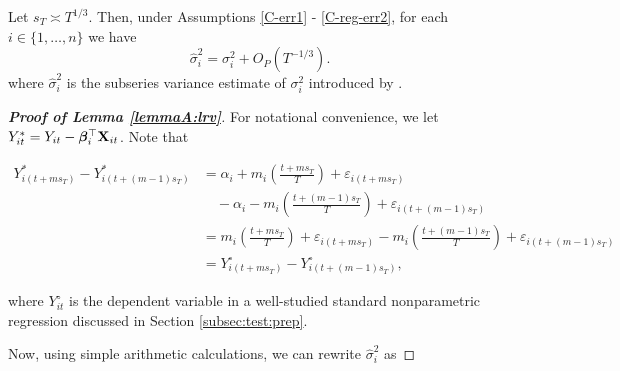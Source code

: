 \documentclass[a4paper,12pt]{article}
\makeatletter
\renewcommand{\eqref}[1]{\tagform@{\ref{#1}}}
\makeatother
\begin{document}
\begin{lemmaA}\label{lemmaA:lrv}
Let $s_T \asymp T^{1/3}$. Then, under Assumptions \ref{C-err1} - \ref{C-reg-err2}, for each $i \in \{1, \ldots, n\}$ we have
$$\widehat{\sigma}_i^2 = \sigma_i^2 + O_P(T^{-1/3}).$$
where $\widehat{\sigma}_i^2$ is the subseries variance estimate of $\sigma_i^2$ introduced by \eqref{eq:lrv}.
\end{lemmaA}
\begin{proof}[\textnormal{\textbf{Proof of Lemma \ref{lemmaA:lrv}}}]
For notational convenience, we let $Y_{it}^* = Y_{it} - \bm{\beta}_i^\top \mathbf{X}_{it}$. Note that 
\begin{small}
\begin{align*}
Y_{i(t + ms_T)}^* - Y_{i(t + (m-1)s_T)}^* &= \alpha_i + m_i\left(\frac{t+m s_T}{T}\right) + \varepsilon_{i(t + ms_T)} \\
&\quad-  \alpha_i - m_i\left(\frac{t+(m-1) s_T}{T}\right) + \varepsilon_{i(t + (m-1)s_T)} \\
&=m_i\left(\frac{t+m s_T}{T}\right) + \varepsilon_{i(t + ms_T)}  - m_i\left(\frac{t+(m-1) s_T}{T}\right) + \varepsilon_{i(t + (m-1)s_T)}\\
& = Y_{i(t + ms_T)}^\circ - Y_{i(t + (m-1)s_T)}^\circ, 
\end{align*}
\end{small}
where $Y_{it}^\circ$ is the dependent variable in a well-studied standard nonparametric regression discussed in Section \ref{subsec:test:prep}.

Now, using simple arithmetic calculations, we can rewrite $\widehat{\sigma}_i^2$ as


\end{proof}
\end{document}
